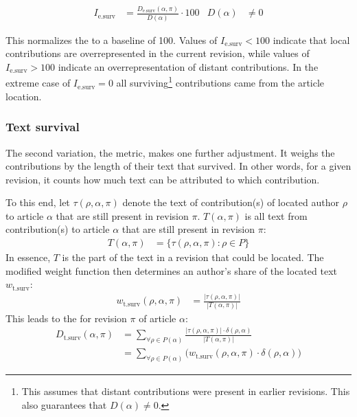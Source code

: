 \begin{align}
 I_{\text{e.surv}} &= \frac{D_{\text{e.surv}}(\alpha,\pi)}{D(\alpha)} \cdot 100 & D(\alpha) &\neq 0
\end{align}

This normalizes the  to a baseline of 100.
Values of $I_{\text{e.surv}} < 100$ indicate that local contributions are overrepresented in the current revision, while values of $I_{\text{e.surv}} > 100$ indicate an overrepresentation of  distant contributions.
In the extreme case of $I_{\text{e.surv}} = 0$ all surviving\footnote{This assumes that distant contributions were present in earlier revisions. This also guarantees that $D(\alpha) \neq 0$.} contributions came from the article location.

\subsubsection{Text survival}

The second variation, the  metric, makes one further adjustment.
It weighs the contributions by the length of their text that survived.
In other words, for a given revision, it counts how much text can be attributed to which contribution.

To this end, let $\tau(\rho,\alpha,\pi)$ denote the text of contribution(s) of located author $\rho$ to article $\alpha$ that are still present in revision $\pi$.
$T(\alpha,\pi)$ is all text from contribution(s) to article $\alpha$ that are still present in revision $\pi$:
\begin{align*}
T(\alpha,\pi) &= \{\tau(\rho,\alpha,\pi) : \rho \in P\}
\end{align*}
In essence, $T$ is the part of the text in a revision that could be located.
The modified weight function then determines an author's share of the located text $w_{\text{t.surv}}$: 
\begin{align*}
w_{\text{t.surv}}(\rho,\alpha,\pi) &= \frac{|\tau(\rho,\alpha,\pi)|}{|T(\alpha,\pi)|}
\end{align*}
This leads to the  for revision $\pi$ of article $\alpha$:
\begin{equation}\label{eqn:sigdistsurvivaltext}
\begin{split}
D_{\text{t.surv}}(\alpha,\pi) & = \sum_{\forall \rho \in P(\alpha)} \frac{|\tau(\rho,\alpha,\pi)| \cdot \delta(\rho,\alpha)}{|T(\alpha,\pi)|} \\
 & =  \sum_{\forall \rho \in P(\alpha)} \big(w_{\text{t.surv}}(\rho,\alpha,\pi) \cdot \delta(\rho,\alpha)\big)
 \end{split}
\end{equation}

